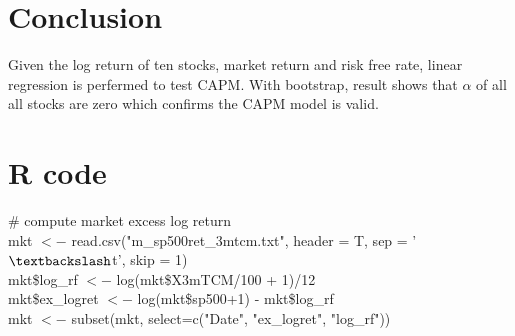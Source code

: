 \documentclass[11pt, conference]{IEEEtran}
\begin{document}
\section{Conclusion}
Given the log return of ten stocks, market return and risk free rate, linear regression is perfermed to test CAPM. With bootstrap, result shows that $\alpha$ of all all stocks are zero which confirms the CAPM model is valid. 










%
%
%

\newpage
\appendices

\setcounter{figure}{0}
\setcounter{table}{0}  

\onecolumn
\section{R code}

\# compute market excess log return \\
mkt $<-$ read.csv("m\_sp500ret\_3mtcm.txt", header = T, sep = '$\textbackslash$t', skip = 1)\\
mkt\$log\_rf $<-$ log(mkt\$X3mTCM/100 + 1)/12\\
mkt\$ex\_logret $<-$ log(mkt\$sp500+1) - mkt\$log\_rf\\
mkt $<-$ subset(mkt, select=c("Date", "ex\_logret", "log\_rf"))\\
\end{document}

